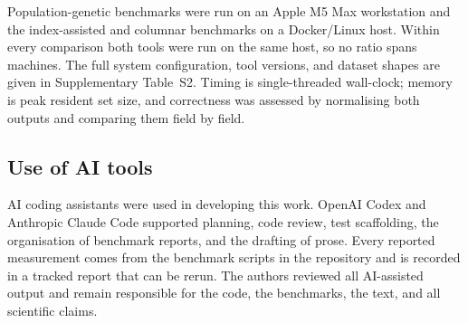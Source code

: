 Population-genetic benchmarks were run on an Apple M5 Max workstation and the
index-assisted and columnar benchmarks on a Docker/Linux host. Within every
comparison both tools were run on the same host, so no ratio spans machines. The
full system configuration, tool versions, and dataset shapes are given in
Supplementary Table~S2. Timing is single-threaded wall-clock; memory is peak
resident set size, and correctness was assessed by normalising both outputs and
comparing them field by field.

\subsection{Use of AI tools}

AI coding assistants were used in developing this work. OpenAI Codex and
Anthropic Claude Code supported planning, code review, test scaffolding, the
organisation of benchmark reports, and the drafting of prose. Every reported
measurement comes from the benchmark scripts in the repository and is recorded
in a tracked report that can be rerun. The authors reviewed all AI-assisted
output and remain responsible for the code, the benchmarks, the text, and all
scientific claims.

